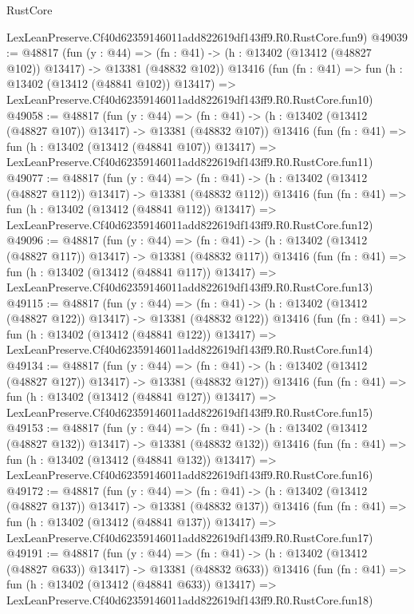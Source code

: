 \begin{lexlean}{RustCore}
\begin{coremodule}
    LexLeanPreserve.Cf40d62359146011add822619df143ff9.R0.RustCore.fun9)
@49039 := @48817
    (fun (y : @44) =>
    (fn : @41) -> (h : @13402 (@13412 (@48827 @102)) @13417) -> @13381 (@48832 @102))
    @13416
    (fun (fn : @41) =>
    fun (h : @13402 (@13412 (@48841 @102)) @13417) =>
    LexLeanPreserve.Cf40d62359146011add822619df143ff9.R0.RustCore.fun10)
@49058 := @48817
    (fun (y : @44) =>
    (fn : @41) -> (h : @13402 (@13412 (@48827 @107)) @13417) -> @13381 (@48832 @107))
    @13416
    (fun (fn : @41) =>
    fun (h : @13402 (@13412 (@48841 @107)) @13417) =>
    LexLeanPreserve.Cf40d62359146011add822619df143ff9.R0.RustCore.fun11)
@49077 := @48817
    (fun (y : @44) =>
    (fn : @41) -> (h : @13402 (@13412 (@48827 @112)) @13417) -> @13381 (@48832 @112))
    @13416
    (fun (fn : @41) =>
    fun (h : @13402 (@13412 (@48841 @112)) @13417) =>
    LexLeanPreserve.Cf40d62359146011add822619df143ff9.R0.RustCore.fun12)
@49096 := @48817
    (fun (y : @44) =>
    (fn : @41) -> (h : @13402 (@13412 (@48827 @117)) @13417) -> @13381 (@48832 @117))
    @13416
    (fun (fn : @41) =>
    fun (h : @13402 (@13412 (@48841 @117)) @13417) =>
    LexLeanPreserve.Cf40d62359146011add822619df143ff9.R0.RustCore.fun13)
@49115 := @48817
    (fun (y : @44) =>
    (fn : @41) -> (h : @13402 (@13412 (@48827 @122)) @13417) -> @13381 (@48832 @122))
    @13416
    (fun (fn : @41) =>
    fun (h : @13402 (@13412 (@48841 @122)) @13417) =>
    LexLeanPreserve.Cf40d62359146011add822619df143ff9.R0.RustCore.fun14)
@49134 := @48817
    (fun (y : @44) =>
    (fn : @41) -> (h : @13402 (@13412 (@48827 @127)) @13417) -> @13381 (@48832 @127))
    @13416
    (fun (fn : @41) =>
    fun (h : @13402 (@13412 (@48841 @127)) @13417) =>
    LexLeanPreserve.Cf40d62359146011add822619df143ff9.R0.RustCore.fun15)
@49153 := @48817
    (fun (y : @44) =>
    (fn : @41) -> (h : @13402 (@13412 (@48827 @132)) @13417) -> @13381 (@48832 @132))
    @13416
    (fun (fn : @41) =>
    fun (h : @13402 (@13412 (@48841 @132)) @13417) =>
    LexLeanPreserve.Cf40d62359146011add822619df143ff9.R0.RustCore.fun16)
@49172 := @48817
    (fun (y : @44) =>
    (fn : @41) -> (h : @13402 (@13412 (@48827 @137)) @13417) -> @13381 (@48832 @137))
    @13416
    (fun (fn : @41) =>
    fun (h : @13402 (@13412 (@48841 @137)) @13417) =>
    LexLeanPreserve.Cf40d62359146011add822619df143ff9.R0.RustCore.fun17)
@49191 := @48817
    (fun (y : @44) =>
    (fn : @41) -> (h : @13402 (@13412 (@48827 @633)) @13417) -> @13381 (@48832 @633))
    @13416
    (fun (fn : @41) =>
    fun (h : @13402 (@13412 (@48841 @633)) @13417) =>
    LexLeanPreserve.Cf40d62359146011add822619df143ff9.R0.RustCore.fun18)

\end{coremodule}
\end{lexlean}
